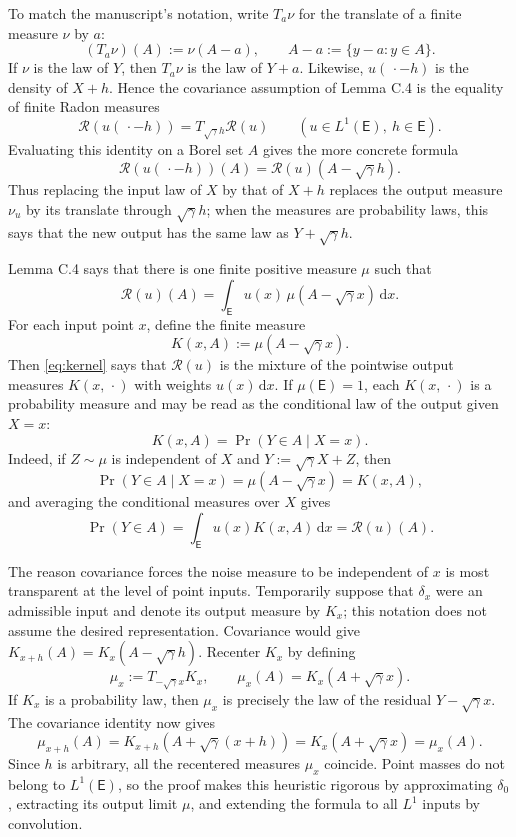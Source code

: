 \documentclass[11pt]{article}
\newcommand{\dd}{\,\mathrm d}
\begin{document}
To match the manuscript's notation, write $T_a\nu$ for the translate of a
finite measure $\nu$ by $a$:
\[
  (T_a\nu)(A):=\nu(A-a),
  \qquad A-a:=\{y-a:y\in A\}.
\]
If $\nu$ is the law of $Y$, then $T_a\nu$ is the law of $Y+a$.
Likewise, $u(\,\cdot-h)$ is the density of $X+h$.  Hence the covariance
assumption of Lemma C.4 is the equality of finite Radon measures
\begin{equation}\label{eq:covariance}
  \mathcal R(u(\,\cdot-h))
  =T_{\sqrt\gamma h}\mathcal R(u)
  \qquad(u\in L^1(\mathsf E),\ h\in\mathsf E).
\end{equation}
Evaluating this identity on a Borel set $A$ gives the more concrete formula
\[
  \mathcal R(u(\,\cdot-h))(A)
  =\mathcal R(u)(A-\sqrt\gamma h).
\]
Thus replacing the input law of $X$ by that of $X+h$ replaces the output
measure $\nu_u$ by its translate through $\sqrt\gamma h$; when the measures
are probability laws, this says that the new output has the same law as
$Y+\sqrt\gamma h$.

Lemma C.4 says that there is one finite positive measure $\mu$ such that
\begin{equation}\label{eq:kernel}
  \mathcal R(u)(A)
  =\int_{\mathsf E}u(x)\,\mu(A-\sqrt\gamma x)\dd x.
\end{equation}
For each input point $x$, define the finite measure
\[
  K(x,A):=\mu(A-\sqrt\gamma x).
\]
Then \eqref{eq:kernel} says that $\mathcal R(u)$ is the mixture of the
pointwise output measures $K(x,\,\cdot)$ with weights $u(x)\dd x$.  If
$\mu(\mathsf E)=1$, each $K(x,\,\cdot)$ is a probability measure and may be read
as the conditional law of the output given $X=x$:
\[
  K(x,A)=\Pr(Y\in A\mid X=x).
\]
Indeed, if $Z\sim\mu$ is independent of $X$ and
$Y:=\sqrt\gamma X+Z$, then
\[
  \Pr(Y\in A\mid X=x)
  =\mu(A-\sqrt\gamma x)=K(x,A),
\]
and averaging the conditional measures over $X$ gives
\[
  \Pr(Y\in A)
  =\int_{\mathsf E}u(x)K(x,A)\dd x
  =\mathcal R(u)(A).
\]

The reason covariance forces the noise measure to be independent of $x$ is
most transparent at the level of point inputs.  Temporarily suppose that
$\delta_x$ were an admissible input and denote its output measure by $K_x$;
this notation does not assume the desired representation.  Covariance would
give $K_{x+h}(A)=K_x(A-\sqrt\gamma h)$.  Recenter $K_x$ by defining
\[
  \mu_x:=T_{-\sqrt\gamma x}K_x,
  \qquad
  \mu_x(A)=K_x(A+\sqrt\gamma x).
\]
If $K_x$ is a probability law, then $\mu_x$ is precisely the law of the
residual $Y-\sqrt\gamma x$.  The covariance identity now gives
\[
  \mu_{x+h}(A)
  =K_{x+h}(A+\sqrt\gamma(x+h))
  =K_x(A+\sqrt\gamma x)
  =\mu_x(A).
\]
Since $h$ is arbitrary, all the recentered measures $\mu_x$ coincide.
Point masses do not belong to $L^1(\mathsf E)$, so the proof makes this heuristic
rigorous by approximating $\delta_0$, extracting its output limit $\mu$,
and extending the formula to all $L^1$ inputs by convolution.
\end{document}
